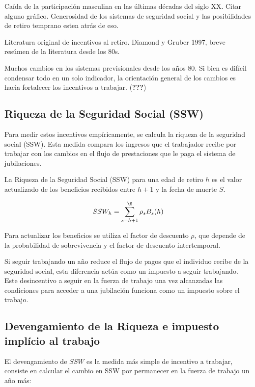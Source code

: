 \documentclass[]{article}
\begin{document}
Caída de la participación masculina en las últimas décadas del siglo XX.
Citar alguno gráfico. Generosidad de los sistemas de seguridad social y
las posibilidades de retiro temprano esten atrás de eso.

Literatura original de incentivos al retiro. Diamond y Gruber 1997,
breve resúmen de la literatura desde los 80s.

Muchos cambios en los sistemas previsionales desde los años 80. Si bien
es difícil condensar todo en un solo indicador, la orientación general
de los cambios es hacia fortalecer los incentivos a trabajar.
({\textbf{???}})

\hypertarget{riqueza-de-la-seguridad-social-ssw}{%
\subsection{Riqueza de la Seguridad Social
(SSW)}\label{riqueza-de-la-seguridad-social-ssw}}

Para medir estos incentivos empíricamente, se calcula la riqueza de la
seguridad social (SSW). Esta medida compara los ingresos que el
trabajador recibe por trabajar con los cambios en el flujo de
prestaciones que le paga el sistema de jubilaciones.

La Riqueza de la Seguridad Social (SSW) para una edad de retiro \(h\) es
el valor actualizado de los beneficios recibidos entre \(h + 1\) y la
fecha de muerte \(S\).

\[ SSW_{h} = \sum_{s=h+1}^{\S} \rho_{s} B_{s}(h)\]

Para actualizar los beneficios se utiliza el factor de descuento
\(\rho\), que depende de la probabilidad de sobrevivencia y el factor de
descuento intertemporal.

Si seguir trabajando un año reduce el flujo de pagos que el individuo
recibe de la seguridad social, esta diferencia actúa como un impuesto a
seguir trabajando. Este desincentivo a seguir en la fuerza de trabajo
una vez alcanzadas las condiciones para acceder a una jubilación
funciona como un impuesto sobre el trabajo.

\hypertarget{devengamiento-de-la-riqueza-e-impuesto-impluxedcio-al-trabajo}{%
\subsection{Devengamiento de la Riqueza e impuesto implício al
trabajo}\label{devengamiento-de-la-riqueza-e-impuesto-impluxedcio-al-trabajo}}

El devengamiento de \(SSW\) es la medida más simple de incentivo a
trabajar, consiste en calcular el cambio en SSW por permanecer en la
fuerza de trabajo un año más:
\end{document}
